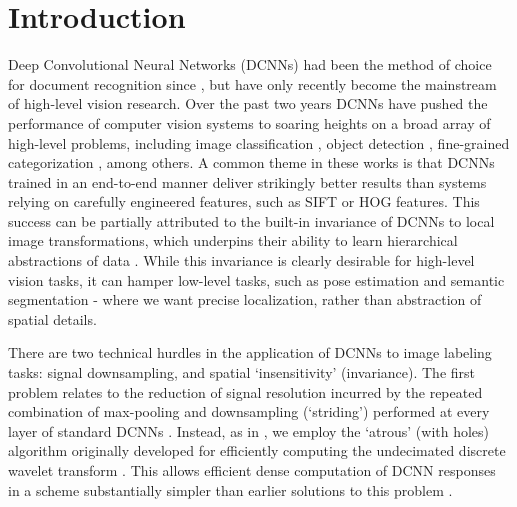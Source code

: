 \section{Introduction}
\label{sec:intro}
Deep Convolutional Neural Networks (DCNNs) had been the method of choice for document recognition since  \citet{LeCun1998}, but 
have only recently become the mainstream of high-level vision research.
Over the past two years  DCNNs have pushed the performance of computer vision systems to soaring heights on a broad array of high-level problems, including image classification \citep{KrizhevskyNIPS2013, sermanet2013overfeat, simonyan2014very, szegedy2014going, papandreou2014untangling}, object detection \citep{girshick2014rcnn}, fine-grained categorization \citep{zhang2014part}, among others.
A common theme in these works is that DCNNs trained in an end-to-end manner  deliver  strikingly better results than systems relying on carefully engineered features, such as SIFT or HOG features.
This success can be partially attributed to the built-in  invariance of DCNNs to local image transformations, which underpins their ability to learn hierarchical abstractions of data \citep{zeiler2014visualizing}. While this invariance is clearly desirable for high-level vision tasks, it can hamper low-level tasks, such as pose estimation \citep{chen2014articulated, tompson2014joint} and semantic segmentation - where we want precise localization, rather than abstraction of spatial details.  %




There are two technical hurdles in the application of DCNNs to image labeling
tasks: signal downsampling, and spatial `insensitivity' (invariance).  The
first problem relates to the reduction of signal resolution incurred by the
repeated combination of max-pooling and downsampling (`striding') performed at
every layer of standard DCNNs \citep{KrizhevskyNIPS2013,
  simonyan2014very, szegedy2014going}. Instead, as in
\citet{papandreou2014untangling}, we employ the `atrous'
(with holes) algorithm originally developed for efficiently computing the
undecimated discrete wavelet transform \cite{Mall99}. This allows efficient dense computation of DCNN responses in a scheme substantially simpler than earlier solutions to this problem \cite{GCMG+13, sermanet2013overfeat}. 

